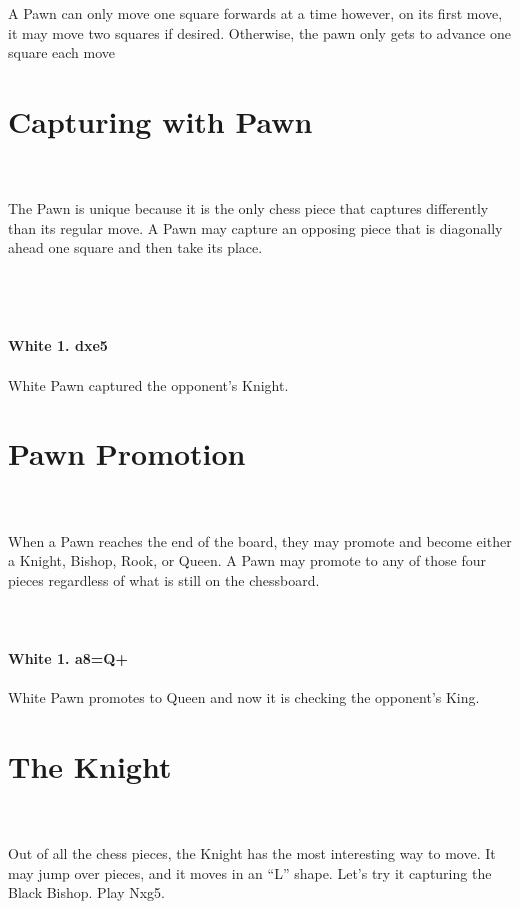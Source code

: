 \documentclass{article}
\begin{document}

\\
\\
A Pawn can only move one square forwards at a time however, on its first move, it may move two squares if desired. Otherwise, the pawn only gets to advance one square each move\section{ Capturing with Pawn}

\\
\\
The Pawn is unique because it is the only chess piece that captures differently than its regular move. A Pawn may capture an opposing piece that is diagonally ahead one square and then take its place.\\\\
\\

\\
\\
\textbf{White 1. dxe5}\\
\\
White Pawn captured the opponent's Knight.\section{ Pawn Promotion}

\\
\\
When a Pawn reaches the end of the board, they may promote and become either a Knight, Bishop, Rook, or Queen. A Pawn may promote to any of those four pieces regardless of what is still on the chessboard.\\
\\

\\
\\
\textbf{White 1. a8=Q+}\\
\\
White Pawn promotes to Queen and now it is checking the opponent's King.\section{ The Knight}

\\
\\
Out of all the chess pieces, the Knight has the most interesting way to move. It may jump over pieces, and it moves in an “L” shape. Let's try it capturing the Black Bishop. Play Nxg5.\\\\
\end{document}
